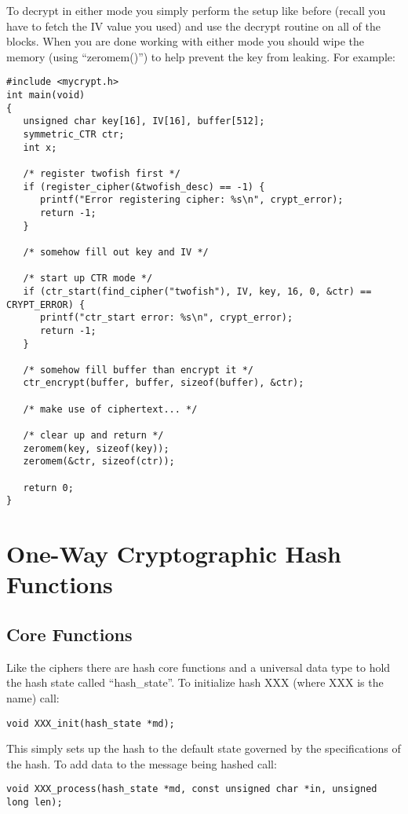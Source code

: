 \documentclass{book}
\begin{document}
To decrypt in either mode you simply perform the setup like before (recall you have to fetch the IV value you used)
and use the decrypt routine on all of the blocks.  When you are done working with either mode you should wipe the 
memory (using ``zeromem()'') to help prevent the key from leaking.  For example:
\newpage
\begin{small}
\begin{verbatim}
#include <mycrypt.h>
int main(void)
{
   unsigned char key[16], IV[16], buffer[512];
   symmetric_CTR ctr;
   int x;

   /* register twofish first */
   if (register_cipher(&twofish_desc) == -1) {
      printf("Error registering cipher: %s\n", crypt_error);
      return -1;
   }

   /* somehow fill out key and IV */

   /* start up CTR mode */
   if (ctr_start(find_cipher("twofish"), IV, key, 16, 0, &ctr) == CRYPT_ERROR) {
      printf("ctr_start error: %s\n", crypt_error);
      return -1;
   }

   /* somehow fill buffer than encrypt it */
   ctr_encrypt(buffer, buffer, sizeof(buffer), &ctr);

   /* make use of ciphertext... */

   /* clear up and return */
   zeromem(key, sizeof(key));
   zeromem(&ctr, sizeof(ctr));

   return 0;
}
\end{verbatim}
\end{small}

\chapter{One-Way Cryptographic Hash Functions}
\section{Core Functions}

Like the ciphers there are hash core functions and a universal data type to hold the hash state called ``hash\_state''.  
To initialize hash XXX (where XXX is the name) call:
\begin{verbatim}
void XXX_init(hash_state *md);
\end{verbatim}

This simply sets up the hash to the default state governed by the specifications of the hash.  To add data to the 
message being hashed call:
\begin{verbatim}
void XXX_process(hash_state *md, const unsigned char *in, unsigned long len);
\end{verbatim}
\end{document}
